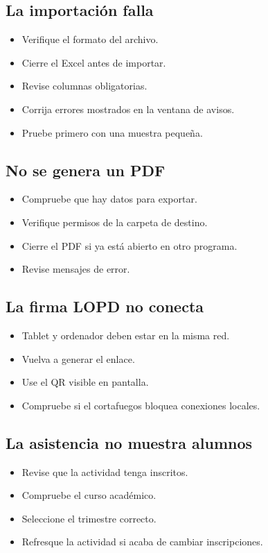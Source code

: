 \documentclass[12pt]{article}
\begin{document}
\subsection{La importación falla}
\begin{itemize}
  \item Verifique el formato del archivo.
  \item Cierre el Excel antes de importar.
  \item Revise columnas obligatorias.
  \item Corrija errores mostrados en la ventana de avisos.
  \item Pruebe primero con una muestra pequeña.
\end{itemize}

\subsection{No se genera un PDF}
\begin{itemize}
  \item Compruebe que hay datos para exportar.
  \item Verifique permisos de la carpeta de destino.
  \item Cierre el PDF si ya está abierto en otro programa.
  \item Revise mensajes de error.
\end{itemize}

\subsection{La firma LOPD no conecta}
\begin{itemize}
  \item Tablet y ordenador deben estar en la misma red.
  \item Vuelva a generar el enlace.
  \item Use el QR visible en pantalla.
  \item Compruebe si el cortafuegos bloquea conexiones locales.
\end{itemize}

\subsection{La asistencia no muestra alumnos}
\begin{itemize}
  \item Revise que la actividad tenga inscritos.
  \item Compruebe el curso académico.
  \item Seleccione el trimestre correcto.
  \item Refresque la actividad si acaba de cambiar inscripciones.
\end{itemize}
\end{document}

